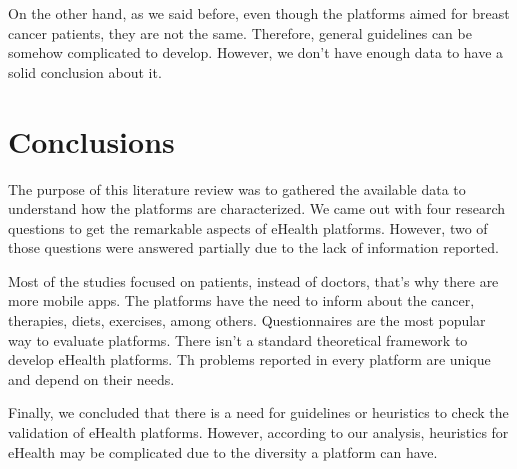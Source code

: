 \documentclass[conference]{IEEEtran}
\begin{document}
On the other hand, as we said before, even though the platforms aimed for breast cancer patients, they are not the same. Therefore, general guidelines can be somehow complicated to develop. However, we don't have enough data to have a solid conclusion about it.

\section{Conclusions}

The purpose of this literature review was to gathered the available data to understand how the platforms are characterized. We came out with four research questions to get the remarkable aspects of eHealth platforms. However, two of those questions were answered partially due to the lack of information reported.

Most of the studies focused on patients, instead of doctors, that's why there are more mobile apps. The platforms have the need to inform about the cancer, therapies, diets, exercises, among others. Questionnaires are the most popular way to evaluate platforms. There isn't a standard theoretical framework to develop eHealth platforms. Th problems reported in every platform are unique and depend on their needs.

Finally, we concluded that there is a need for guidelines or heuristics to check the validation of eHealth platforms. However, according to our analysis, heuristics for eHealth may be complicated due to the diversity a platform can have.




\end{document}
